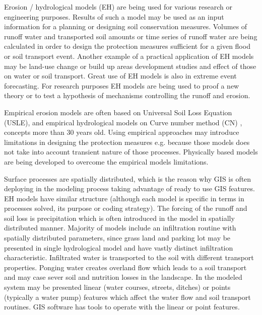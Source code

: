 Erosion / hydrological models (EH) are being used for various research or engineering purposes. 
Results of such a model may be used as an input information for a planning 
or designing soil conservation measures. 
Volumes of runoff water and transported soil amounts
or time series of runoff water are being calculated
in order to design the protection measures sufficient for a given flood 
or soil transport event. Another example of a practical 
application of EH models may be land-use change or build up areas development studies 
and effect of those on water or soil transport. 
Great use of EH models is also in extreme event 
forecasting. For research purposes EH models 
are being used to proof a new theory or to test a hypothesis of mechanisms controlling the runoff and erosion.

Empirical erosion models are often based on Universal Soil Loss Equation (USLE), 
\cite{wischmeier1978,renard1997} and empirical hydrological models on Curve 
number method (CN) \cite{cronshey1986}, concepts more than 30 years old. 
Using empirical approaches may introduce limitations in designing the protection measures e.g. 
because those models does not take into account transient nature of those processes. 
Physically based models are being developed to overcome the empirical models limitations. 

Surface processes are spatially distributed, which is the reason why GIS 
is often deploying in the modeling process taking advantage 
of ready to use GIS features. EH models have similar structure 
(although each model is specific in terms in processes solved, 
its purpose or coding strategy). The forcing of the runoff and soil loss is precipitation
which is often introduced in the model in spatially distributed 
manner. Majority of models include an infiltration routine with 
spatially distributed parameters, since grass land 
and parking lot may be presented in single hydrological model 
and have vastly distinct infiltration characteristic. Infiltrated 
water is transported to the soil with different transport properties. 
Ponging water creates overland flow which leads to a soil transport 
and may case sever soil and nutrition losses in the landscape. 
In the modeled system may be presented linear (water courses, streets, ditches) 
or points (typically a water pump) features which affect the water 
flow and soil transport routines. GIS software has tools 
to operate with the linear or point features. 


